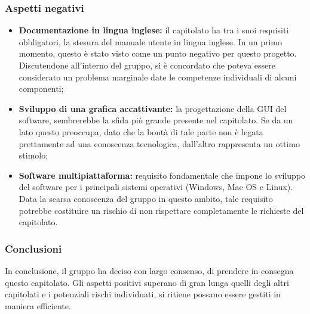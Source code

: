 \subsubsection{Aspetti negativi}
\label{aspettineg3}
\begin{itemize}
\item\textbf{Documentazione in lingua inglese:} il capitolato ha tra i suoi requisiti obbligatori, la stesura del manuale utente in lingua inglese. In un primo momento, questo è stato visto come un punto negativo per questo progetto. Discutendone all'interno del gruppo, si è concordato che poteva essere considerato un problema marginale date le competenze individuali di alcuni componenti;
\item\textbf{Sviluppo di una grafica accattivante:} la progettazione della GUI\glossario{} del software, sembrerebbe la sfida più grande presente nel capitolato. Se da un lato questo preoccupa, dato che la bontà di tale parte non è legata prettamente ad una conoscenza tecnologica, dall'altro rappresenta un ottimo stimolo;
\item\textbf{Software multipiattaforma:} requisito fondamentale che impone lo sviluppo del software per i principali sistemi operativi (Windows\glossario{}, Mac OS\glossario{} e Linux\glossario{}). Data la scarsa conoscenza del gruppo in questo ambito, tale requisito potrebbe costituire un rischio di non rispettare completamente le richieste del capitolato.
\end{itemize}

\subsubsection{Conclusioni}
\label{conclusioni3}
In conclusione, il gruppo \authorName{} ha deciso con largo consenso, di prendere in consegna questo capitolato. Gli aspetti positivi superano di gran lunga quelli degli altri capitolati e i potenziali rischi individuati, si ritiene possano essere gestiti in maniera  efficiente.